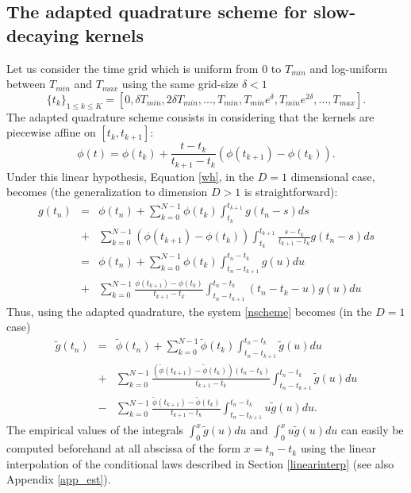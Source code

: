 \documentclass[a4paper,11pt]{article}
\begin{document}
\subsection{The adapted quadrature scheme for slow-decaying kernels}
Let us consider the time grid which is uniform from $0$ to $T_{min}$ and log-uniform between $T_{min}$ and $T_{max}$ using the same grid-size $\delta<1$
\begin{equation}
\label{points}
\{t_k\}_{1\le k\leq K}=[0,\delta T_{min},2\delta T_{min},...,T_{min},T_{min} e^{\delta},T_{min} e^{2\delta},...,T_{max}].
\end{equation}
The adapted quadrature scheme consists in considering that the kernels are piecewise affine on $[t_k,t_{k+1}]$:
$$\phi(t)=\phi(t_k)+\frac{t-t_k}{t_{k+1}-t_k}(\phi(t_{k+1})-\phi(t_k)).$$
Under this linear hypothesis, Equation \eqref{wh}, in the $D=1$ dimensional case, becomes (the generalization to dimension $D>1$ is straightforward):
\begin{eqnarray*}
g(t_n)&=&\phi(t_n)+\sum_{k=0}^{N-1} \phi(t_k) \int_{t_k}^{t_{k+1}}g(t_n-s)ds\\
&+&\sum_{k=0}^{N-1} (\phi(t_{k+1})-\phi(t_k)) \int_{t_k}^{t_{k+1}} \frac{s-t_k}{t_{k+1}-t_k} g(t_n-s)ds\\
&=&\phi(t_n)+\sum_{k=0}^{N-1} \phi(t_k) \int_{t_n-t_{k+1}}^{t_n-t_{k}}  g(u)du\\
&+&\sum_{k=0}^{N-1} \frac{\phi(t_{k+1})-\phi(t_k)}{t_{k+1}-t_k} \int_{t_n-t_{k+1}}^{t_n-t_{k}} (t_n-t_k-u) g(u)du
\end{eqnarray*}
Thus, using the adapted quadrature, the system \eqref{nscheme} becomes (in the $D=1$ case)
\begin{eqnarray}
\label{thequad}
\nonumber
\tilde g(t_n)&=&\tilde \phi(t_n)+\sum_{k=0}^{N-1} \tilde \phi(t_k) \int_{t_n-t_{k+1}}^{t_n-t_{k}}  \tilde  g(u)du\\
\nonumber
&+&\sum_{k=0}^{N-1} \frac{(\tilde \phi(t_{k+1})-\tilde \phi(t_k))(t_n-t_k)}{t_{k+1}-t_k} \int_{t_n-t_{k+1}}^{t_n-t_{k}}  \tilde  g(u)du\\
&-&\sum_{k=0}^{N-1} \frac{\tilde \phi(t_{k+1})-\tilde \phi(t_k)}{t_{k+1}-t_k} \int_{t_n-t_{k+1}}^{t_n-t_{k}} u \tilde g(u)du.
\end{eqnarray}
\noindent The empirical values of the integrals $\int_0^x \tilde g(u)du$ and $\int_0^x u \tilde g(u)du$ can easily be computed beforehand at all abscissa of the form $x=t_n-t_k$ using the linear interpolation of the conditional laws described in Section \ref{linearinterp} (see also Appendix \ref{app_est}).\\
\end{document}
